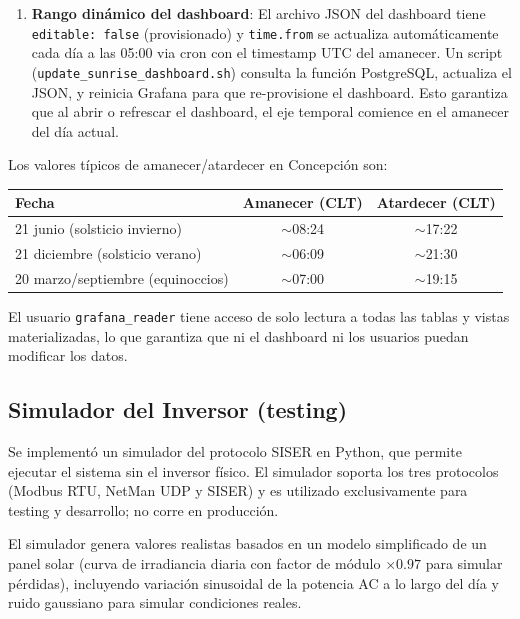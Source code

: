\documentclass[12pt,a4paper]{article}
\begin{document}
\begin{enumerate}
    \item \textbf{Rango din\'amico del dashboard}: El archivo JSON del dashboard tiene \texttt{editable: false} (provisionado) y \texttt{time.from} se actualiza autom\'aticamente cada d\'ia a las 05:00 via cron con el timestamp UTC del amanecer. Un script (\texttt{update\_sunrise\_dashboard.sh}) consulta la funci\'on PostgreSQL, actualiza el JSON, y reinicia Grafana para que re-provisione el dashboard. Esto garantiza que al abrir o refrescar el dashboard, el eje temporal comience en el amanecer del d\'ia actual.
\end{enumerate}

Los valores t\'ipicos de amanecer/atardecer en Concepci\'on son:

\begin{center}
\begin{tabular}{lcc}
\toprule
\textbf{Fecha} & \textbf{Amanecer (CLT)} & \textbf{Atardecer (CLT)} \\
\midrule
21 junio (solsticio invierno) & $\sim$08:24 & $\sim$17:22 \\
21 diciembre (solsticio verano) & $\sim$06:09 & $\sim$21:30 \\
20 marzo/septiembre (equinoccios) & $\sim$07:00 & $\sim$19:15 \\
\bottomrule
\end{tabular}
\end{center}

El usuario \texttt{grafana\_reader} tiene acceso de solo lectura a todas las tablas y vistas materializadas, lo que garantiza que ni el dashboard ni los usuarios puedan modificar los datos.

\subsection{Simulador del Inversor (testing)}

Se implement\'o un simulador del protocolo SISER en Python, que permite ejecutar el sistema sin el inversor f\'isico. El simulador soporta los tres protocolos (Modbus RTU, NetMan UDP y SISER) y es utilizado exclusivamente para testing y desarrollo; no corre en producci\'on.

El simulador genera valores realistas basados en un modelo simplificado de un panel solar (curva de irradiancia diaria con factor de m\'odulo $\times 0.97$ para simular p\'erdidas), incluyendo variaci\'on sinusoidal de la potencia AC a lo largo del d\'ia y ruido gaussiano para simular condiciones reales.
\end{document}
